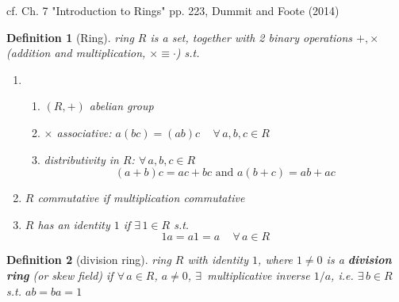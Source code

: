 \documentclass[10pt]{amsart}
\newtheorem{definition}{Definition}
\begin{document}
\begin{multicols*}{2}
cf. Ch. 7 "Introduction to Rings" pp. 223, Dummit and Foote (2014)\cite{DuFo2003}

\begin{definition}[Ring]
ring $R$ is a set, together with 2 binary operations $+, \times $ (addition and multiplication, $\times \equiv \cdot $) s.t. 
\begin{enumerate} 
\item \begin{enumerate}
	\item $(R, +)$ abelian group 
	\item $\times $ associative: $a(bc) = (ab)c \quad \, \forall \, a, b, c \in R$  
	\item distributivity in $R$: $\forall \, a , b, c \in R$ 
	\[
	(a+b)c = ac + bc \text{ and } a(b+c) = ab + ac
	\]
\end{enumerate}	
\item $R$ \emph{commutative} if multiplication commutative
\item $R$ has an identity $1$ if $\exists \, 1 \in R$ s.t.
\[
1a = a1 = a \quad \, \forall \, a \in R
\]
\end{enumerate}
\end{definition}

\begin{definition}[division ring]
	ring $R$ with identity $1$, where $1\neq 0$ is a \textbf{division ring} (or skew field) if $\forall \, a \in R$, $a\neq 0$, $\exists \, $ multiplicative inverse $1/a$, i.e. $\exists \, b\in R$ s.t. $ab=ba = 1$
\end{definition}


\end{multicols*}
\end{document}
